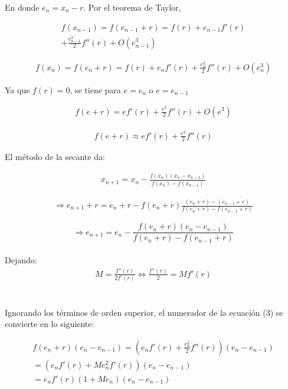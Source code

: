 \documentclass[10pt,technote]{IEEEtran}
\begin{document}
En donde $e_n = x_n - r$. Por el teorema de Taylor,

\begin{gather*}
f(x_{n-1})= f(e_{n-1}+r) = f(r)+e_{n-1}f'(r) \\
+\frac{e^{2}_{n-1}}{2}f''(r)+O(e^{3}_{n-1})
\end{gather*}

\begin{gather*}
f(x_{n})= f(e_n+r) = f(r)+e_{n}f'(r)+\frac{e^{2}_n}{2}f''(r)+O(e^{3}_n)
\end{gather*}

Ya que $f(r)=0$, se tiene para $e=e_n$ o $e=e_{n-1}$

\begin{gather*}
f(e+r)= e f'(r)+\frac{e^{2}}{2}f''(r)+O(e^{3})
\end{gather*}

\begin{gather*}
f(e+r) \approx e f'(r)+\frac{e^{2}}{2}f''(r)
\end{gather*}

El método de la secante da:

\begin{gather*}
x_{n+1 }= x_{n} - \frac{f(x_{n})(x_{n}-x_{n-1})}{f(x_{n})-f(x_{n-1})} 
\end{gather*}

\begin{gather*}
\Rightarrow e_{n+1}+r= e_{n} + r - f(e_n + r) \frac{(e_n +r) -(e_{n-1}+r)}{f(e_n + r)-f(e_{n-1} + r)} 
\end{gather*}

\begin{equation}
\Rightarrow e_{n+1}= e_{n} - \frac{f(e_n + r)(e_n - e_{n-1})}{f(e_n + r)-f(e_{n-1} + r)} 
\end{equation}\\

Dejando:\\

\begin{gather*}
M= \frac{f''(r)}{2f'(r)} \Leftrightarrow \frac{f''(r)}{2} = Mf'(r)
\end{gather*}\\\\

Ignorando los términos de orden superior, el numerador de la ecuación (3) se convierte en lo siguiente:

\begin{gather*}
    f(e_n +r)(e_n - e_{n-1})= (e_nf'(r)+\frac{e^{2}_n}{2}f''(r))(e_n -e_{n-1}) \\
    = (e_nf'(r)+Me^{2}_nf'(r))(e_n -e_{n-1}) \\
    = e_nf'(r)(1+Me_n)(e_n -e_{n-1})
\end{gather*} 
\end{document}
